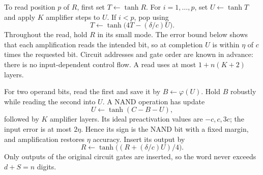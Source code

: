 \documentclass[11pt]{article}
\theoremstyle{remark}
\begin{document}
To read position $p$ of $R$, first set $T\leftarrow\tanh R$.
For $i=1,\ldots,p$, set $U\leftarrow\tanh T$ and apply $K$
amplifier steps to $U$. If $i<p$, pop using
\[
 T\leftarrow\tanh\bigl(4T-(\delta/c)U\bigr).
\]
Throughout the read, hold $R$ in its small mode. The error bound below
shows that each amplification reads the intended bit, so at completion
$U$ is within $\eta$ of $c$ times the requested bit. Circuit addresses
and gate order are known in advance: there is no input-dependent control
flow. A read uses at most $1+n(K+2)$ layers.

For two operand bits, read the first and save it by
$B\leftarrow\varphi(U)$. Hold $B$ robustly while reading the second
into $U$. A NAND operation has update
\[
 U\leftarrow\tanh(C-B-U),
\]
followed by $K$ amplifier layers. Its ideal preactivation values are
$-c,c,3c$; the input error is at most $2\eta$. Hence its sign is the
NAND bit with a fixed margin, and amplification restores $\eta$ accuracy.
Insert its output by
\[
 R\leftarrow\tanh\bigl((R+(\delta/c)U)/4\bigr).
\]
Only outputs of the original circuit gates are inserted, so the word
never exceeds $d+S=n$ digits.
\end{document}
